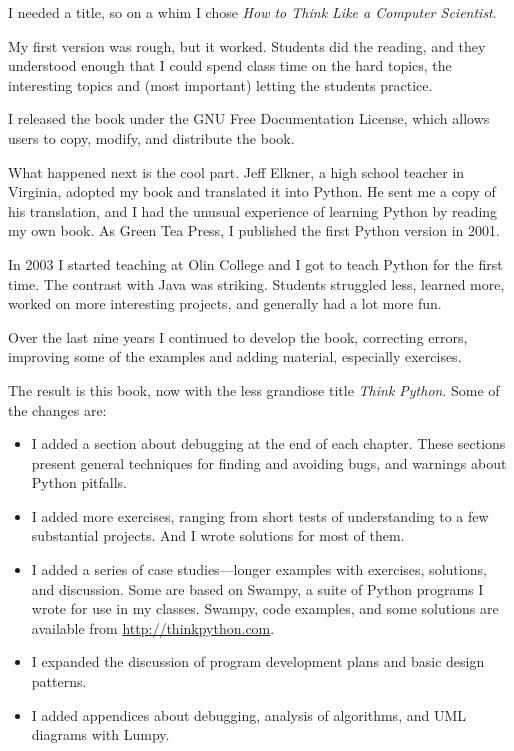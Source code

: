 \documentclass[10pt]{book}
\begin{document}
I needed a title, so on a whim I chose {\em How to Think Like
a Computer Scientist}.

My first version was rough, but it worked.  Students did the reading,
and they understood enough that I could spend class time on the hard
topics, the interesting topics and (most important) letting the
students practice.

I released the book under the GNU Free Documentation License,
which allows users to copy, modify, and distribute the book.

What happened next is the cool part.  Jeff Elkner, a high school
teacher in Virginia, adopted my book and translated it into
Python.  He sent me a copy of his translation, and I had the
unusual experience of learning Python by reading my own book.
As Green Tea Press, I published the first Python version in 2001.

In 2003 I started teaching at Olin College and I got to teach
Python for the first time.  The contrast with Java was striking.
Students struggled less, learned more, worked on more interesting
projects, and generally had a lot more fun.

Over the last nine years I continued to develop the book,
correcting errors, improving some of the examples and
adding material, especially exercises.

The result is this book, now with the less grandiose title
{\em Think Python}.  Some of the changes are:

\begin{itemize}

\item I added a section about debugging at the end of each chapter.
  These sections present general techniques for finding and avoiding
  bugs, and warnings about Python pitfalls.

\item I added more exercises, ranging from short tests of
  understanding to a few substantial projects.  And I wrote
  solutions for most of them.

\item I added a series of case studies---longer examples with
  exercises, solutions, and discussion.  Some are based on
  Swampy, a suite of Python programs I wrote for use in my classes.
  Swampy, code examples, and some solutions are available from
  \url{http://thinkpython.com}.
  
\item I expanded the discussion of program development plans
  and basic design patterns.

\item I added appendices about debugging, analysis of algorithms, and
  UML diagrams with Lumpy.

\end{itemize}
\end{document}
